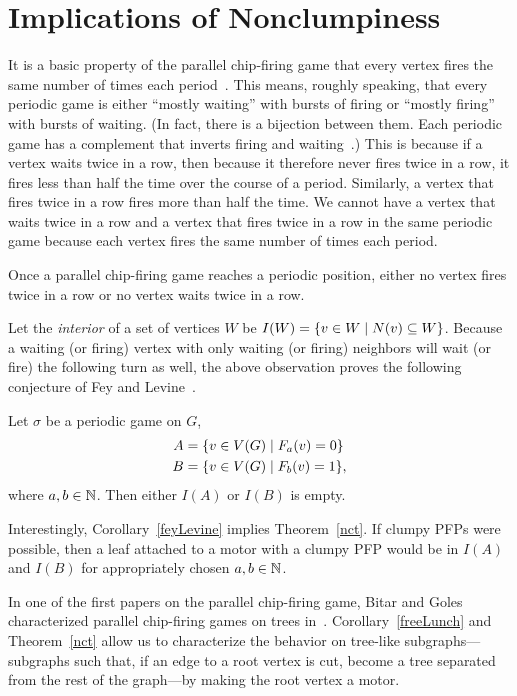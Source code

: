 \section{Implications of Nonclumpiness} \label{corollaries}
It is a basic property of the parallel chip-firing game that every vertex fires
the same number of times each period~\cite{jiang}. This means, roughly
speaking, that every periodic game is either ``mostly waiting'' with bursts of
firing or ``mostly firing'' with bursts of waiting. (In fact, there is a
bijection between them. Each periodic game has a complement that inverts firing
and waiting~\cite{jiang}.) This is because if a vertex waits twice in a row,
then because it therefore never fires twice in a row, it fires less than half
the time over the course of a period. Similarly, a vertex that fires twice in a
row fires more than half the time. We cannot have a vertex that waits twice
in a row and a vertex that fires twice in a row in the same periodic game
because each vertex fires the same number of times each period.

\begin{cor}
Once a parallel chip-firing game reaches a periodic position, either no vertex
fires twice in a row or no vertex waits twice in a row.
\end{cor}

Let the \emph{interior} of a set of vertices $W$ be $I(W) = \set{v \in W}{N(v)
  \subseteq W}$. Because a waiting (or firing) vertex with only waiting (or
firing) neighbors will wait (or fire) the following turn as well, the above
observation proves the following conjecture of Fey and
Levine~\cite{privateComms}.

\begin{cor}\label{feyLevine}
Let $\sigma$ be a periodic game on $G$,
\begin{align*}
  A &= \set{v \in \V}{\firing{v}{a} = 0} \\
  B &= \set{v \in \V}{\firing{v}{b} = 1},
\end{align*}
where $a,b \in \mathbb{N}$. Then either $I(A)$ or $I(B)$ is empty.
\end{cor}

Interestingly, Corollary~\ref{feyLevine} implies Theorem~\ref{nct}. If clumpy
PFPs were possible, then a leaf attached to a motor with a clumpy PFP would be
in $I(A)$ and $I(B)$ for appropriately chosen $a,b \in \mathbb{N}$.

In one of the first papers on the parallel chip-firing game, Bitar and Goles
characterized parallel chip-firing games on trees in~\cite{bitarGoles}.
Corollary~\ref{freeLunch} and Theorem~\ref{nct} allow us to characterize the
behavior on tree-like subgraphs---subgraphs such that, if an edge to a root
vertex is cut, become a tree separated from the rest of the graph---by making
the root vertex a motor.

